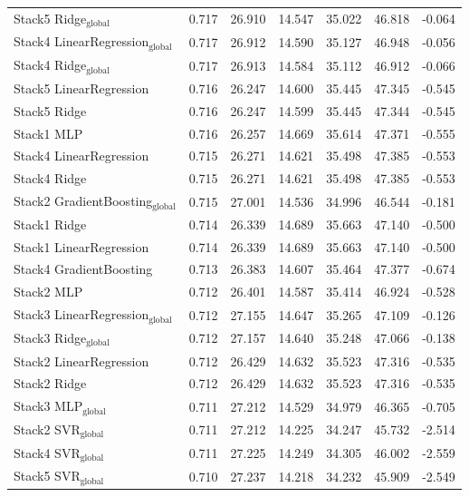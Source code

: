 \documentclass[a4paper,twocolumn]{article}
\begin{document}
\begin{table}
{\begin{tabular}{p{4.5cm}cccccc}
        Stack5 Ridge$_{\text{global}}$ & 0.717 & 26.910 & 14.547 & 35.022 & 46.818 & -0.064 \\
        Stack4 LinearRegression$_{\text{global}}$ & 0.717 & 26.912 & 14.590 & 35.127 & 46.948 & -0.056 \\
        Stack4 Ridge$_{\text{global}}$ & 0.717 & 26.913 & 14.584 & 35.112 & 46.912 & -0.066 \\
        Stack5 LinearRegression & 0.716 & 26.247 & 14.600 & 35.445 & 47.345 & -0.545 \\
        Stack5 Ridge & 0.716 & 26.247 & 14.599 & 35.445 & 47.344 & -0.545 \\
        Stack1 MLP & 0.716 & 26.257 & 14.669 & 35.614 & 47.371 & -0.555 \\
        Stack4 LinearRegression & 0.715 & 26.271 & 14.621 & 35.498 & 47.385 & -0.553 \\
        Stack4 Ridge & 0.715 & 26.271 & 14.621 & 35.498 & 47.385 & -0.553 \\
        Stack2 GradientBoosting$_{\text{global}}$ & 0.715 & 27.001 & 14.536 & 34.996 & 46.544 & -0.181 \\
        Stack1 Ridge & 0.714 & 26.339 & 14.689 & 35.663 & 47.140 & -0.500 \\
        Stack1 LinearRegression & 0.714 & 26.339 & 14.689 & 35.663 & 47.140 & -0.500 \\
        Stack4 GradientBoosting & 0.713 & 26.383 & 14.607 & 35.464 & 47.377 & -0.674 \\
        Stack2 MLP & 0.712 & 26.401 & 14.587 & 35.414 & 46.924 & -0.528 \\
        Stack3 LinearRegression$_{\text{global}}$ & 0.712 & 27.155 & 14.647 & 35.265 & 47.109 & -0.126 \\
        Stack3 Ridge$_{\text{global}}$ & 0.712 & 27.157 & 14.640 & 35.248 & 47.066 & -0.138 \\
        Stack2 LinearRegression & 0.712 & 26.429 & 14.632 & 35.523 & 47.316 & -0.535 \\
        Stack2 Ridge & 0.712 & 26.429 & 14.632 & 35.523 & 47.316 & -0.535 \\
        Stack3 MLP$_{\text{global}}$ & 0.711 & 27.212 & 14.529 & 34.979 & 46.365 & -0.705 \\
        Stack2 SVR$_{\text{global}}$ & 0.711 & 27.212 & 14.225 & 34.247 & 45.732 & -2.514 \\
        Stack4 SVR$_{\text{global}}$ & 0.711 & 27.225 & 14.249 & 34.305 & 46.002 & -2.559 \\
        Stack5 SVR$_{\text{global}}$ & 0.710 & 27.237 & 14.218 & 34.232 & 45.909 & -2.549 \\

\end{tabular}}
\end{table}
\end{document}
